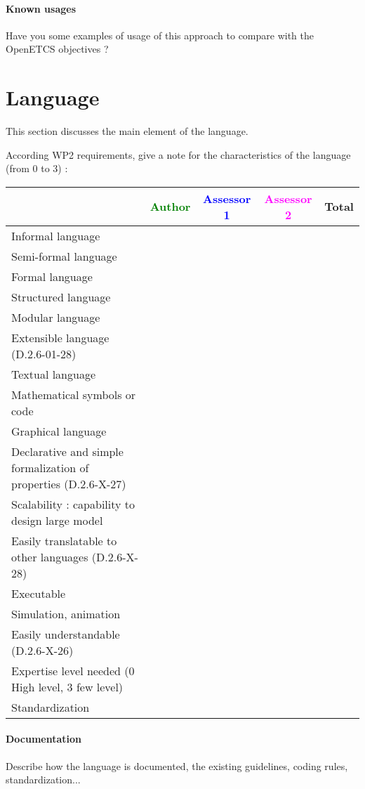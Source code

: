 \paragraph{Known usages} Have you some examples of usage of this approach to  compare with the OpenETCS objectives ?

\section{Language}
This section discusses the main element of the language.

According WP2 requirements, give a note for the characteristics of the language (from 0 to 3) :

\begin{tabular}{|l | c | c | c | c|}
\hline
& \textcolor{green}{Author} & \textcolor{blue}{Assessor 1} & \textcolor{magenta}{Assessor 2} & Total \\
\hline 
Informal language & & & &  \\
\hline 
Semi-formal language & & & &  \\
\hline
Formal language & & & &  \\
\hline
Structured language & & & & \\
\hline
Modular language & & & & \\
\hline
Extensible language (D.2.6-01-28) & & & & \\
\hline
Textual language & & & & \\
\hline
Mathematical symbols or code & & & & \\
\hline
Graphical language & & & & \\
\hline
Declarative and simple formalization of properties (D.2.6-X-27) & & & & \\
\hline
Scalability : capability to design large model & & & & \\
\hline
Easily translatable to other languages (D.2.6-X-28) & & & & \\
\hline
Executable & & & & \\
\hline
Simulation, animation & & & & \\
\hline
Easily understandable (D.2.6-X-26) & & & & \\
\hline
Expertise level needed (0 High level, 3 few level) & & & & \\
\hline
Standardization & & & & \\
\hline
\end{tabular}


\paragraph{Documentation} Describe how the language is documented, the existing guidelines, coding rules, standardization...

